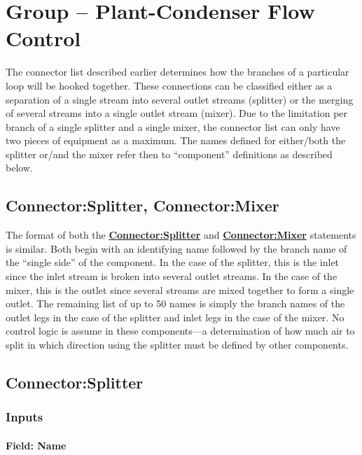 \section{Group -- Plant-Condenser Flow Control}\label{group-plant-condenser-flow-control}

The connector list described earlier determines how the branches of a particular loop will be hooked together. These connections can be classified either as a separation of a single stream into several outlet streams (splitter) or the merging of several streams into a single outlet stream (mixer). Due to the limitation per branch of a single splitter and a single mixer, the connector list can only have two pieces of equipment as a maximum. The names defined for either/both the splitter or/and the mixer refer then to ``component'' definitions as described below.

\subsection{Connector:Splitter, Connector:Mixer}\label{connectorsplitter-connectormixer}

The format of both the \textbf{\hyperref[connectorsplitter]{Connector:Splitter}} and \textbf{\hyperref[connectormixer]{Connector:Mixer}} statements is similar. Both begin with an identifying name followed by the branch name of the ``single side'' of the component. In the case of the splitter, this is the inlet since the inlet stream is broken into several outlet streams. In the case of the mixer, this is the outlet since several streams are mixed together to form a single outlet. The remaining list of up to 50 names is simply the branch names of the outlet legs in the case of the splitter and inlet legs in the case of the mixer. No control logic is assume in these components---a determination of how much air to split in which direction using the splitter must be defined by other components.

\subsection{Connector:Splitter}\label{connectorsplitter}

\subsubsection{Inputs}\label{inputs-034}

\paragraph{Field: Name}\label{field-name-033}

